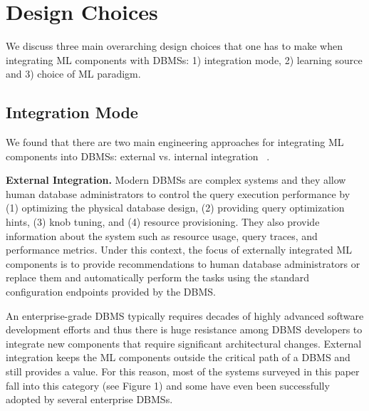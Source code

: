 \section{Design Choices}

We discuss three main overarching design choices that one has to make when integrating ML components with DBMSs: 1) integration mode, 2)  learning source and 3) choice of ML paradigm.


\subsection{Integration Mode}
We found that there are two main engineering approaches for integrating ML components into DBMSs: external vs. internal integration ~\cite{pavlo2019external}.

\vspace{2mm}
\noindent \textbf{External Integration.} Modern DBMSs are complex systems and they allow human database administrators to control the query execution performance by (1) optimizing the physical database design, (2) providing query optimization hints, (3) knob tuning, and (4) resource provisioning.
They also provide information about the system such as resource usage, query traces, and performance metrics.
Under this context, the focus of externally integrated ML components is to provide recommendations to human database administrators or replace them and automatically perform the tasks using the standard configuration endpoints provided by the DBMS.

An enterprise-grade DBMS typically requires decades of highly advanced software development efforts and thus there is huge resistance among DBMS developers to integrate new components that require significant architectural changes.
External integration keeps the ML components outside the critical path of a DBMS and still provides a value.
For this reason, most of the systems surveyed in this paper fall into this category (see Figure 1) and some have even been successfully adopted by several enterprise DBMSs.


